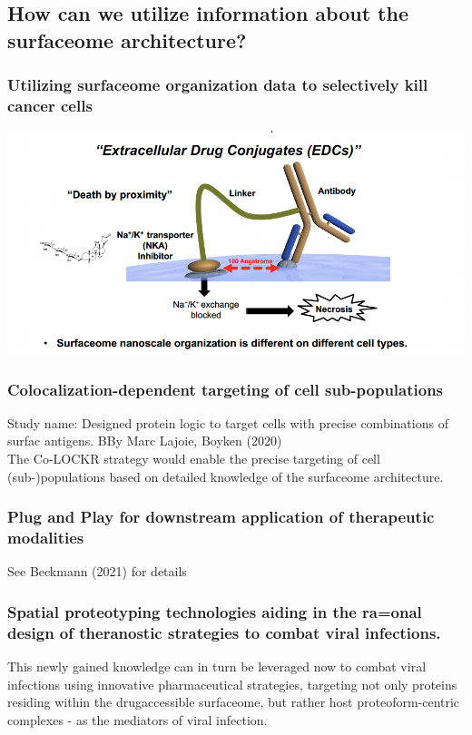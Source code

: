 \begin{itemize}
\begin{itemize}
\subsection{How can we utilize information about the surfaceome
architecture?}
\subsubsection{Utilizing surfaceome organization data to selectively kill
cancer cells}
\includegraphics[width=1\textwidth]{Images/KillingCancer.png}\\[1cm]

\subsubsection{Colocalization-dependent targeting of cell sub-populations}
Study name: Designed protein logic to target cells with precise combinations of surfac antigens. BBy Marc Lajoie, Boyken (2020)
\\The Co-LOCKR strategy would enable the precise targeting of cell (sub-)populations based on detailed knowledge of the surfaceome architecture.

\subsubsection{Plug and Play for downstream application of therapeutic modalities}
See Beckmann (2021) for details

\subsubsection{Spatial proteotyping technologies aiding in the ra=onal
design of theranostic strategies to combat viral infections.}
This newly gained knowledge can in turn be leveraged now to combat viral infections using
innovative pharmaceutical strategies, targeting not only proteins residing within the drugaccessible
surfaceome, but rather host proteoform-centric complexes - as the mediators of
viral infection.


\end{itemize}
\end{itemize}
